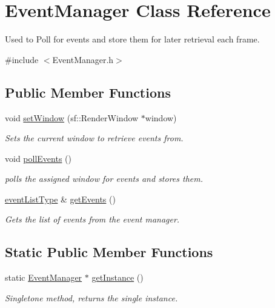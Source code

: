 \hypertarget{class_event_manager}{\section{Event\-Manager Class Reference}
\label{d6/d94/class_event_manager}
}


Used to Poll for events and store them for later retrieval each frame.  




{\ttfamily \#include $<$Event\-Manager.\-h$>$}

\subsection*{Public Member Functions}
\begin{DoxyCompactItemize}
\item 
void \hyperlink{class_event_manager_a27be54b647b22fddc0f8f53592ce3d8b}{set\-Window} (sf\-::\-Render\-Window $\ast$window)
\begin{DoxyCompactList}\small\item\em Sets the current window to retrieve events from. \end{DoxyCompactList}\item 
void \hyperlink{class_event_manager_ad4d1c917d12e4bc0e7aa946c64e16cd7}{poll\-Events} ()
\begin{DoxyCompactList}\small\item\em polls the assigned window for events and stores them. \end{DoxyCompactList}\item 
\hyperlink{_event_manager_8h_a6ce9eb912b58654c59461fee2a8e7994}{event\-List\-Type} \& \hyperlink{class_event_manager_a7cd671ef1543ec52aac1db8c48655995}{get\-Events} ()
\begin{DoxyCompactList}\small\item\em Gets the list of events from the event manager. \end{DoxyCompactList}\end{DoxyCompactItemize}
\subsection*{Static Public Member Functions}
\begin{DoxyCompactItemize}
\item 
static \hyperlink{class_event_manager}{Event\-Manager} $\ast$ \hyperlink{class_event_manager_aef79fefe8afd354f1fa02e7bd4e87052}{get\-Instance} ()
\begin{DoxyCompactList}\small\item\em Singletone method, returns the single instance. \end{DoxyCompactList}\end{DoxyCompactItemize}


